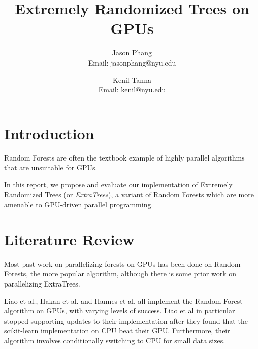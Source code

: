 \documentclass[10pt,conference]{IEEEtran}
\begin{document}
\title{Extremely Randomized Trees on GPUs}


\author{
  Jason Phang \\ {Email: jasonphang@nyu.edu}
  \and
  Kenil Tanna \\ {Email: kenil@nyu.edu}
}


\maketitle

\IEEEpeerreviewmaketitle

\section{Introduction}

Random Forests\cite{random_forests} are often the textbook example of highly parallel algorithms that are unsuitable for GPUs. 

In this report, we propose and evaluate our implementation of Extremely Randomized Trees\cite{extra_trees} (or \textit{ExtraTrees}), a variant of Random Forests which are more amenable to GPU-driven parallel programming.

\section{Literature Review}

Most past work on parallelizing forests on GPUs has been done on Random Forests, the more popular algorithm, although there is some prior work on parallelizing ExtraTrees. 

Liao et al.\cite{cudatree}, Hakan et al.\cite{cudarf} and Hannes et al. \cite{curfil} all implement the Random Forest algorithm on GPUs, with varying levels of success. Liao et al in particular stopped supporting updates to their implementation after they found that the scikit-learn implementation on CPU beat their GPU. Furthermore, their algorithm involves conditionally switching to CPU for small data sizes.
\end{document}

